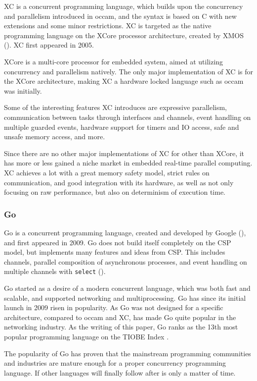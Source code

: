 XC is a concurrent programming language, which builds upon the concurrency and parallelism introduced in occam, and the syntax is based on C with new extensions and some minor restrictions. XC is targeted as the native programming language on the XCore processor architecture, created by XMOS (\citet{xc09}). XC first appeared in 2005.

XCore is a multi-core processor for embedded system, aimed at utilizing concurrency and parallelism natively. The only major implementation of XC is for the XCore architecture, making XC a hardware locked language such as occam was initially. 

Some of the interesting features XC introduces are expressive parallelism, communication between tasks through interfaces and channels, event handling on multiple guarded events, hardware support for timers and IO access, safe and unsafe memory access, and more.

Since there are no other major implementations of XC for other than XCore, it has more or less gained a niche market in embedded real-time parallel computing. XC achieves a lot with a great memory safety model, strict rules on communication, and good integration with its hardware, as well as not only focusing on raw performance, but also on determinism of execution time. 

\subsubsection{Go}
\label{sssec:go}

Go is a concurrent programming language, created and developed by Google (\citet{golangintro12}), and first appeared in 2009. Go does not build itself completely on the CSP model, but implements many features and ideas from CSP. This includes channels, parallel composition of asynchronous processes, and event handling on multiple channels with \texttt{select} (\citet{golangspec09}).

Go started as a desire of a modern concurrent language, which was both fast and scalable, and supported networking and multiprocessing. Go has since its initial launch in 2009 risen in popularity. As Go was not designed for a specific architecture, compared to occam and XC, has made Go quite popular in the networking industry. As the writing of this paper, Go ranks as the 13th most popular programming language on the TIOBE Index \citep{gopopularity}.

The popularity of Go has proven that the mainstream programming communities and industries are mature enough for a proper concurrency programming language. If other languages will finally follow after is only a matter of time.


